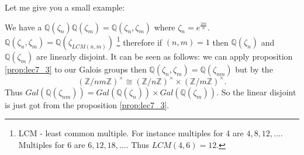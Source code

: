 Let me give you a small example:
\begin{example}
  We have a 
  $\mathbb{Q}\left(\zeta_n\right) \mathbb{Q}\left(\zeta_m\right) =
  \mathbb{Q}\left(\zeta_n, \zeta_m\right)$ where
  $\zeta_n = e^{\frac{2 \pi i}{n}}$.
  $\mathbb{Q}\left(\zeta_n, \zeta_m\right) =
  \mathbb{Q}\left(\zeta_{LCM\left(n,m\right)}\right)$
  \footnote{
    LCM - least common multiple. For instance multiples for 4 are
    $4,8,12, \dots$. Multiples for 6 are $6,12,18, \dots$. Thus
    $LCM\left(4,6\right) = 12$.
  } therefore if $\left(n,m\right) = 1$ then
  $\mathbb{Q}\left(\zeta_n\right)$ and
  $\mathbb{Q}\left(\zeta_m\right)$ are linearly disjoint. It can be
  seen as follows: we can apply proposition \ref{prop:lec7_3} to our
  Galois groups then
  $\mathbb{Q}\left(\zeta_n, \zeta_m\right) =
  \mathbb{Q}\left(\zeta_{nm}\right)$ but by the
  \[
  \left(\mathbb{Z}/nm\mathbb{Z}\right)^\times \cong
  \left(\mathbb{Z}/n\mathbb{Z}\right)^\times \times
  \left(\mathbb{Z}/m\mathbb{Z}\right)^\times. 
  \]
  Thus $Gal\left(\mathbb{Q}\left(\zeta_{nm}\right)\right) =
  Gal\left(\mathbb{Q}\left(\zeta_{n}\right)\right) \times
  Gal\left(\mathbb{Q}\left(\zeta_{m}\right)\right)$. So the linear
  disjoint is just got from the proposition \ref{prop:lec7_3}.
\end{example}
